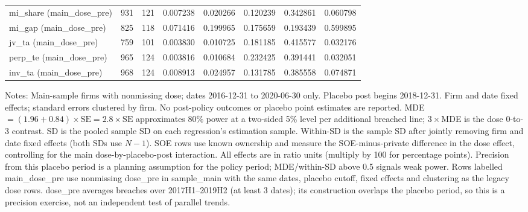 \begin{tabular}{lrrrrrrr}
mi\_share (main\_dose\_pre) & 931 & 121 & 0.007238 & 0.020266 & 0.120239 & 0.342861 & 0.060798 \\
mi\_gap (main\_dose\_pre) & 825 & 118 & 0.071416 & 0.199965 & 0.175659 & 0.193439 & 0.599895 \\
jv\_ta (main\_dose\_pre) & 759 & 101 & 0.003830 & 0.010725 & 0.181185 & 0.415577 & 0.032176 \\
perp\_te (main\_dose\_pre) & 965 & 124 & 0.003816 & 0.010684 & 0.232425 & 0.391441 & 0.032051 \\
inv\_ta (main\_dose\_pre) & 968 & 124 & 0.008913 & 0.024957 & 0.131785 & 0.385558 & 0.074871 \\
\bottomrule
\end{tabular}\endgroup
\par\smallskip
\noindent\begin{minipage}{\linewidth}\footnotesize
Notes: Main-sample firms with nonmissing dose; dates 2016-12-31 to 2020-06-30 only. Placebo post begins 2018-12-31. Firm and date fixed effects; standard errors clustered by firm. No post-policy outcomes or placebo point estimates are reported.
MDE $=(1.96+0.84)\times\mathrm{SE}=2.8\times\mathrm{SE}$ approximates 80\% power at a two-sided 5\% level per additional breached line; $3\times$MDE is the dose 0-to-3 contrast.
SD is the pooled sample SD on each regression's estimation sample. Within-SD is the sample SD after jointly removing firm and date fixed effects (both SDs use $N-1$). SOE rows use known ownership and measure the SOE-minus-private difference in the dose effect, controlling for the main dose-by-placebo-post interaction.
All effects are in ratio units (multiply by 100 for percentage points). Precision from this placebo period is a planning assumption for the policy period; MDE/within-SD above 0.5 signals weak power.
Rows labelled main\_dose\_pre use nonmissing dose\_pre in sample\_main with the same dates, placebo cutoff, fixed effects and clustering as the legacy dose rows. dose\_pre averages breaches over 2017H1--2019H2 (at least 3 dates); its construction overlaps the placebo period, so this is a precision exercise, not an independent test of parallel trends.
\end{minipage}
